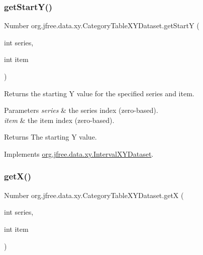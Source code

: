 \mbox{\label{classorg_1_1jfree_1_1data_1_1xy_1_1_category_table_x_y_dataset_a238f0976910c53c4ad62cf58ec3e758c}} 
\subsubsection{\texorpdfstring{get\+Start\+Y()}{getStartY()}}
{\footnotesize\ttfamily Number org.\+jfree.\+data.\+xy.\+Category\+Table\+X\+Y\+Dataset.\+get\+StartY (\begin{DoxyParamCaption}\item[{int}]{series,  }\item[{int}]{item }\end{DoxyParamCaption})}

Returns the starting Y value for the specified series and item.


\begin{DoxyParams}{Parameters}
{\em series} & the series index (zero-\/based). \\
\hline
{\em item} & the item index (zero-\/based).\\
\hline
\end{DoxyParams}
\begin{DoxyReturn}{Returns}
The starting Y value. 
\end{DoxyReturn}


Implements \mbox{\hyperlink{interfaceorg_1_1jfree_1_1data_1_1xy_1_1_interval_x_y_dataset_afdd414735adb233734bc35b76a005ed9}{org.\+jfree.\+data.\+xy.\+Interval\+X\+Y\+Dataset}}.

\mbox{\label{classorg_1_1jfree_1_1data_1_1xy_1_1_category_table_x_y_dataset_ac4f984661a2f855b1e4a82d05731b1f4}} 
\subsubsection{\texorpdfstring{get\+X()}{getX()}}
{\footnotesize\ttfamily Number org.\+jfree.\+data.\+xy.\+Category\+Table\+X\+Y\+Dataset.\+getX (\begin{DoxyParamCaption}\item[{int}]{series,  }\item[{int}]{item }\end{DoxyParamCaption})}

